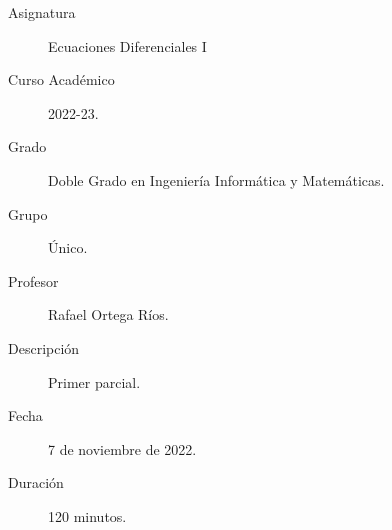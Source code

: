 \documentclass[12pt]{article}
\begin{document}

    
    

    \begin{description}
        \item[Asignatura] Ecuaciones Diferenciales I
        \item[Curso Académico] 2022-23.
        \item[Grado] Doble Grado en Ingeniería Informática y Matemáticas.
        \item[Grupo] Único.
        \item[Profesor] Rafael Ortega Ríos.
        \item[Descripción] Primer parcial.
        \item[Fecha] 7 de noviembre de 2022.
        \item[Duración] 120 minutos.
    
    \end{description}
    \newpage
\end{document}
